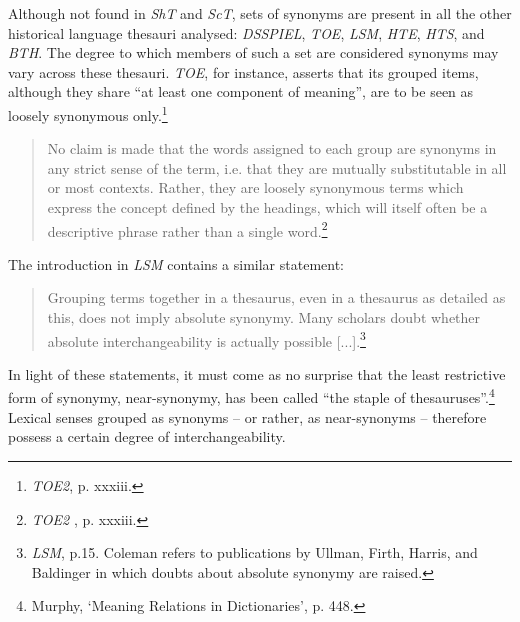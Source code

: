 Although not found in \textit{ShT} and \textit{ScT}, sets of synonyms are present in all the other historical language thesauri analysed: \textit{DSSPIEL}, \textit{TOE}, \textit{LSM}, \textit{HTE}, \textit{HTS}, and \textit{BTH}. The degree to which members of such a set are considered synonyms may vary across these thesauri. \textit{TOE}, for instance, asserts that its grouped items, although they share ``at least one component of meaning'', are to be seen as loosely synonymous only.\footnote{\textit{TOE2}, p. xxxiii.}
\begin{quotation} \noindent
No claim is made that the words assigned to each group are synonyms in any strict sense of the term, i.e. that they are mutually substitutable in all or most contexts. Rather, they are loosely synonymous terms which express the concept defined by the headings, which will itself often be a descriptive phrase rather than a single word.\footnote{\textit{TOE2}%
, p. xxxiii.}
\end{quotation}
The introduction in \textit{LSM} contains a similar statement:
\begin{quotation} \noindent
Grouping terms together in a thesaurus, even in a thesaurus as detailed as this, does not imply absolute synonymy. Many scholars doubt whether absolute interchangeability is actually possible [...].\footnote{\textit{LSM}, p.15. Coleman refers to publications by Ullman, Firth, Harris, and Baldinger in which doubts about absolute synonymy are raised.}
\end{quotation}
In light of these statements, it must come as no surprise that the least restrictive form of synonymy, near-synonymy, has been called ``the staple of thesauruses''.\footnote{Murphy, `Meaning Relations in Dictionaries', p. 448.} Lexical senses grouped as synonyms -- or rather, as near-synonyms -- therefore possess a certain degree of interchangeability. 



